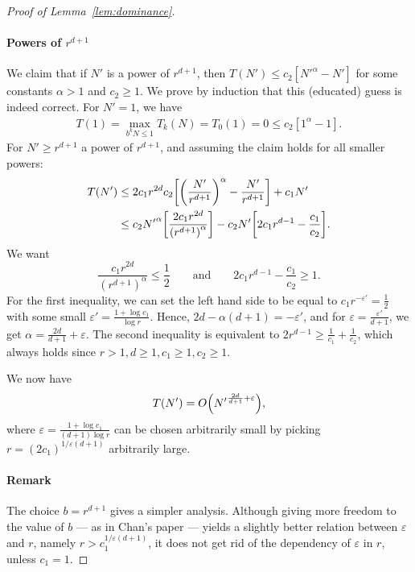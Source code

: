\begin{proof}[Proof of Lemma~\ref{lem:dominance}]
\paragraph{Powers of $r^{d+1}$}
We claim that if $N'$ is a power of $r^{d+1}$, then $T(N') \le c_2[{N'}^\alpha - N']$
for some constants $\alpha > 1$ and $c_2 \ge 1$. We prove by
induction that this (educated) guess is indeed correct.
For $N' = 1$, we have
\begin{align*}
	T(1)
	=
	\max_{b^{k}N \le 1} T_{k} (N)
	=
	T_0(1)
	=
	0
	\le
	c_2[1^{\alpha} - 1].
\end{align*}
For $N' \ge r^{d+1}$ a power of $r^{d+1}$,
and assuming the claim holds for all smaller powers:
\begin{align*}
	T(N')
	&\le
	2 c_1r^{2d}c_2\mleft[{\mleft(\frac{N'}{r^{d+1}}\mright)}^\alpha
	-\frac{N'}{r^{d+1}}\mright]
	+
	c_1 N'\\
	&\le c_2 {N'}^\alpha
	\mleft[\frac{2c_1r^{2d}}{{(r^{d+1})}^\alpha}\mright]
	- c_2 N' \mleft[2c_1r^{d-1} -
	\frac{c_1}{c_2}\mright].
\end{align*}
We want
\begin{equation*}
\frac{c_1r^{2d}}{{(r^{d+1})}^\alpha} \le \frac 12
\qquad
\text{and}
\qquad
2c_1r^{d-1} - \frac{c_1}{c_2} \ge 1.
\end{equation*}
For the first inequality, we can set the left hand side to be equal to
$c_1 r^{-\varepsilon'} = \frac{1}{2}$
with some small $\varepsilon' = \frac{1 + \log c_1}{\log r}$.
%
Hence,
$2d - \alpha(d+1) = -\varepsilon'$, and for $\varepsilon = \frac
{\varepsilon'} {d+1}$, we get $\alpha = \frac{2d}{d+1} + \varepsilon$.
%
The second inequality is equivalent to
$2r^{d-1} \ge \frac{1}{c_1} + \frac{1}{c_2}$,
which always holds since
$r > 1, d \ge 1, c_1 \ge 1, c_2 \ge 1$.

We now have
\begin{displaymath}
	T(N') = O\mleft({N'}^{\frac{2d}{d+1}+\varepsilon}\mright),
\end{displaymath}
where
$\varepsilon = \frac{1+\log c_1}{(d+1)\log r}$
can be chosen arbitrarily small by picking
$r = {(2c_1)}^{1/\varepsilon (d+1)}$
arbitrarily large.

\paragraph{Remark}
The choice $b=r^{d+1}$ gives a simpler analysis. Although giving more
freedom to the value of $b$ --- as in Chan's paper --- yields a slightly better
relation between $\varepsilon$ and $r$, namely
$r>c_1^{1/\varepsilon (d+1)}$, it does not get rid of the dependency
of $\varepsilon$ in $r$, unless $c_1=1$.


\end{proof}
